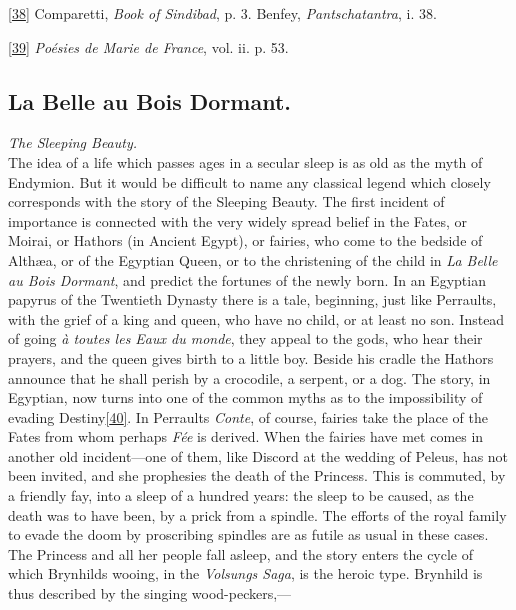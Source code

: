 \documentclass[14pt,a4paper]{memoir}
\begin{document}
\protect\hypertarget{4533318093929944247_33931-h-0.htm.xhtmlux5cux23Footnote_38}{}{}\protect\hyperlink{4533318093929944247_33931-h-0.htm.xhtmlux5cux23FNanchor_38}{{{[}38{]}}}
Comparetti, \emph{Book of Sindibad}, p. 3. Benfey,
\emph{Pantschatantra}, i. 38.

\protect\hypertarget{4533318093929944247_33931-h-0.htm.xhtmlux5cux23Footnote_39}{}{}\protect\hyperlink{4533318093929944247_33931-h-0.htm.xhtmlux5cux23FNanchor_39}{{{[}39{]}}}
\emph{Poésies de Marie de France}, vol. ii. p. 53.

\subsection{La Belle au Bois Dormant.}

\emph{The Sleeping Beauty.} \\

The idea of a life which passes ages in a secular sleep is as old as the
myth of Endymion. But it would be difficult to name any classical legend
which closely corresponds with the story of the Sleeping Beauty. The
first incident of importance is connected with the very widely spread
belief in the Fates, or Moirai, or Hathors (in Ancient Egypt), or
fairies, who come to the bedside of Althæa, or of the Egyptian Queen, or
to the christening of the child in \emph{La Belle au Bois Dormant}, and
predict the fortunes of the newly born. In an Egyptian papyrus of the
Twentieth Dynasty there is a tale, beginning, just like
Perrault\textquotesingle s, with the grief of a king and queen, who have
no child, or at least no son. Instead of going \emph{à toutes les Eaux
du monde}, they appeal to the gods, who hear their prayers, and the
queen gives birth to a little boy. Beside his cradle the Hathors
announce that he shall perish by a crocodile, a serpent, or a dog. The
story, in Egyptian, now turns into one of the common myths as to the
impossibility of evading
Destiny\protect\hypertarget{4533318093929944247_33931-h-0.htm.xhtmlux5cux23FNanchor_40}{}{}\protect\hyperlink{4533318093929944247_33931-h-0.htm.xhtmlux5cux23Footnote_40}{{[}40{]}}.
In Perrault\textquotesingle s \emph{Conte}, of course, fairies take the
place of the Fates from whom perhaps \emph{Fée} is derived. When the
fairies have met comes in another old incident---one of them, like
Discord at the wedding of Peleus, has not been invited, and she
prophesies the death of the Princess. This is commuted, by a friendly
fay, into a sleep of a hundred years: the sleep to be caused, as the
death was to have been, by a prick from a spindle. The efforts of the
royal family to evade the doom by proscribing spindles are as futile as
usual in these cases. The Princess and all her people fall asleep, and
the story enters the cycle of which Brynhild\textquotesingle s wooing,
in the \emph{Volsung\textquotesingle s Saga}, is the heroic type.
Brynhild is thus described by the singing wood-peckers,---
\end{document}

